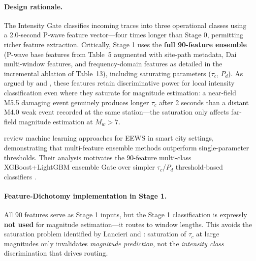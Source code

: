 \documentclass[10pt]{article}
\renewcommand{\cite}[1]{\citep{#1}}
\begin{document}
\paragraph{Design rationale.} The Intensity Gate classifies incoming traces into three operational classes using a 2.0-second P-wave feature vector---four times longer than Stage 0, permitting richer feature extraction. Critically, Stage 1 uses the \textbf{full 90-feature ensemble} (P-wave base features from Table~5 augmented with site-path metadata, Dai multi-window features, and frequency-domain features as detailed in the incremental ablation of Table~13), including saturating parameters (\(\tau_c\), \(P_d\)). As argued by \citet{ref22} and \citet{ref17}, these features retain discriminative power for local intensity classification even where they saturate for magnitude estimation: a near-field M5.5 damaging event genuinely produces longer \(\tau_c\) after 2 seconds than a distant M4.0 weak event recorded at the same station---the saturation only affects far-field magnitude estimation at \(M_w > 7\).

\citet{ref59} review machine learning approaches for EEWS in smart city settings, demonstrating that multi-feature ensemble methods outperform single-parameter thresholds. Their analysis motivates the 90-feature multi-class XGBoost+LightGBM ensemble Gate over simpler \(\tau_c\)/\(P_d\) threshold-based classifiers \cite{ref22}.

\paragraph{Feature-Dichotomy implementation in Stage 1.} All 90 features serve as Stage 1 inputs, but the Stage 1 classification is expressly \textbf{not used} for magnitude estimation---it routes to window lengths. This avoids the saturation problem identified by Lancieri and \citet{ref24}: saturation of \(\tau_c\) at large magnitudes only invalidates \emph{magnitude prediction}, not the \emph{intensity class} discrimination that drives routing.
\end{document}
